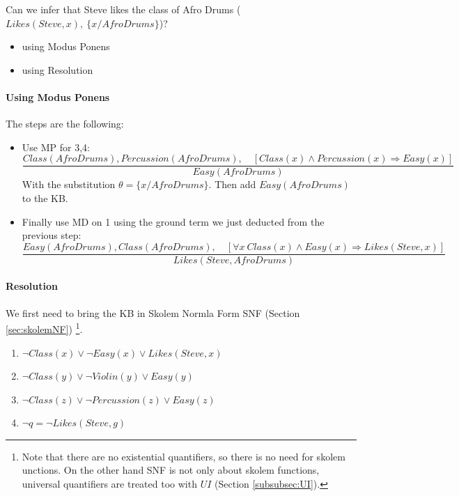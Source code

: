 \documentclass[10pt,a4paper]{article}
\begin{document}
Can we infer that Steve likes the class of Afro Drums ($Likes(Steve,x),\ \{x/AfroDrums\}$)?
\begin{itemize}
\item using Modus Ponens
\item using Resolution
\end{itemize} 


\paragraph{Using Modus Ponens}
The steps are the following:
\begin{itemize}
\item Use MP for 3,4:
\[\frac{Class(AfroDrums), Percussion(AfroDrums),\quad [Class(x)\wedge Percussion(x) \Rightarrow Easy(x)]}{Easy(AfroDrums)}\]
With the substitution $\theta=\lbrace x/AfroDrums \rbrace$. Then add  $Easy(AfroDrums)$ to the KB.

\item Finally use MD on 1 using the ground term we just deducted from the previous step:
\[\frac{Easy(AfroDrums),Class(AfroDrums),\quad [\forall x\ Class(x)\wedge Easy(x) \Rightarrow Likes(Steve,x)]}{Likes(Steve,AfroDrums)}\]
\end{itemize}


\paragraph{Resolution}
We first need to bring the KB in  Skolem Normla Form SNF (Section \ref{sec:skolemNF}) \footnote{Note that there are no existential quantifiers, so there is no need for skolem unctions. On the other hand SNF is not only about skolem functions, universal quantifiers are treated too with $UI$ (Section \ref{subsubsec:UI}). }.

\begin{enumerate}
\item $\neg Class(x) \vee \neg Easy(x) \vee Likes(Steve,x)$
\item $\neg Class(y) \vee \neg Violin(y) \vee Easy(y)$
\item $\neg Class(z) \vee \neg Percussion(z) \vee Easy(z)$
\item $\neg q=\neg Likes(Steve,g)$
\end{enumerate}
\end{document}
